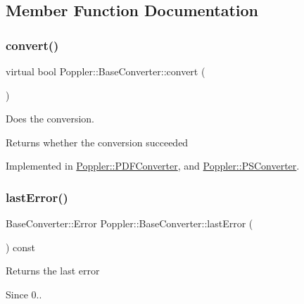 \subsection{Member Function Documentation}
\mbox{\label{class_poppler_1_1_base_converter_a272756d051ce3795a89772eaa93cadca}} 
\subsubsection{\texorpdfstring{convert()}{convert()}}
{\footnotesize\ttfamily virtual bool Poppler\+::\+Base\+Converter\+::convert (\begin{DoxyParamCaption}{ }\end{DoxyParamCaption})\hspace{0.3cm}{\ttfamily [pure virtual]}}

Does the conversion.

\begin{DoxyReturn}{Returns}
whether the conversion succeeded 
\end{DoxyReturn}


Implemented in \hyperlink{class_poppler_1_1_p_d_f_converter_a35f0de4e846e850c489b7f1b265908b5}{Poppler\+::\+P\+D\+F\+Converter}, and \hyperlink{class_poppler_1_1_p_s_converter_a106cc524ec1d73ab7f6bbb6cf1deede9}{Poppler\+::\+P\+S\+Converter}.

\mbox{\label{class_poppler_1_1_base_converter_acade48d93b9ea0f09bdf3fa6a44b7f02}} 
\subsubsection{\texorpdfstring{last\+Error()}{lastError()}}
{\footnotesize\ttfamily Base\+Converter\+::\+Error Poppler\+::\+Base\+Converter\+::last\+Error (\begin{DoxyParamCaption}{ }\end{DoxyParamCaption}) const}

Returns the last error \begin{DoxySince}{Since}
0.. 
\end{DoxySince}


